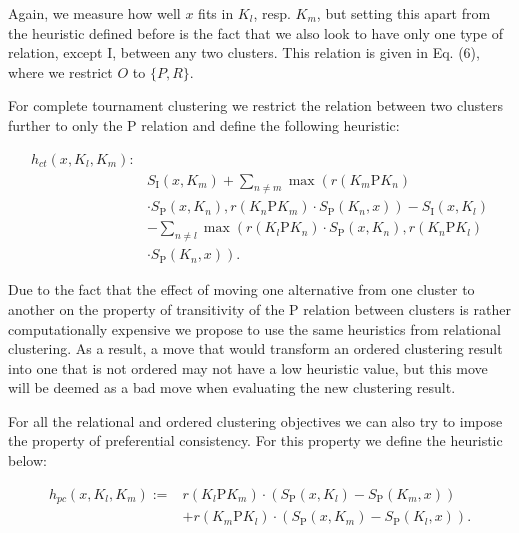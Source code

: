 \documentclass[10pt]{article}
\begin{document}
Again, we measure how well $x$ fits in $K_{l}$, resp. $K_{m}$, but setting this apart from the heuristic defined before is the fact that we also look to have only one type of relation, except I, between any two clusters. This relation is given in Eq. (6), where we restrict $O$ to $\{P, R\}$.

For complete tournament clustering we restrict the relation between two clusters further to only the P relation and define the following heuristic:

$$
\begin{aligned}
h_{c t}\left(x, K_{l}, K_{m}\right): & \\
\qquad & S_{\mathrm{I}}\left(x, K_{m}\right)+\sum_{n \neq m} \max \left(r\left(K_{m} \mathrm{P} K_{n}\right)\right. \\
& \left.\cdot S_{\mathrm{P}}\left(x, K_{n}\right), r\left(K_{n} \mathrm{P} K_{m}\right) \cdot S_{\mathrm{P}}\left(K_{n}, x\right)\right)-S_{\mathrm{I}}\left(x, K_{l}\right) \\
& -\sum_{n \neq l} \max \left(r\left(K_{l} \mathrm{P} K_{n}\right) \cdot S_{\mathrm{P}}\left(x, K_{n}\right), r\left(K_{n} \mathrm{P} K_{l}\right)\right. \\
& \left.\cdot S_{\mathrm{P}}\left(K_{n}, x\right)\right) .
\end{aligned}
$$

Due to the fact that the effect of moving one alternative from one cluster to another on the property of transitivity of the P relation between clusters is rather computationally expensive we propose to use the same heuristics from relational clustering. As a result, a move that would transform an ordered clustering result into one that is not ordered may not have a low heuristic value, but this move will be deemed as a bad move when evaluating the new clustering result.

For all the relational and ordered clustering objectives we can also try to impose the property of preferential consistency. For this property we define the heuristic below:

$$
\begin{aligned}
h_{p c}\left(x, K_{l}, K_{m}\right):= & r\left(K_{l} \mathrm{P} K_{m}\right) \cdot\left(S_{\mathrm{P}}\left(x, K_{l}\right)-S_{\mathrm{P}}\left(K_{m}, x\right)\right) \\
& +r\left(K_{m} \mathrm{P} K_{l}\right) \cdot\left(S_{\mathrm{P}}\left(x, K_{m}\right)-S_{\mathrm{P}}\left(K_{l}, x\right)\right) .
\end{aligned}
$$
\end{document}
